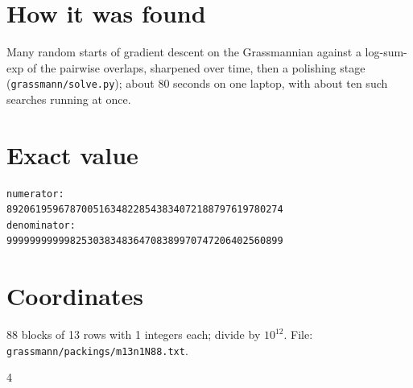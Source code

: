 \documentclass[11pt,a4paper]{article}
\begin{document}
\section{How it was found}
Many random starts of gradient descent on the Grassmannian against a log-sum-exp of the pairwise overlaps, sharpened over time, then a polishing stage (\texttt{grassmann/solve.py}); about 80 seconds on one laptop, with about ten such searches running at once.


\appendix
\section{Exact value}
{\small
\begin{verbatim}
numerator:
892061959678700516348228543834072188797619780274
denominator:
999999999998253038348364708389970747206402560899
\end{verbatim}}

\section{Coordinates}
88 blocks of 13 rows with 1 integers each; divide by $10^{12}$. File: \texttt{grassmann/packings/m13n1N88.txt}.
{\tiny
\begin{multicols}{4}
\end{multicols}}
\end{document}
